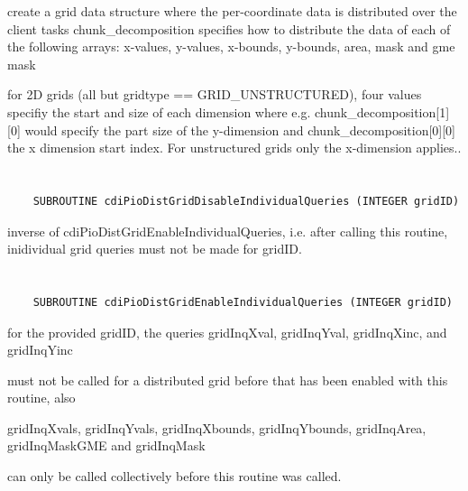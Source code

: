 create a grid data structure where the
per-coordinate data is distributed over the client tasks
chunk_decomposition specifies how to distribute the data of each of
the following arrays:
x-values, y-values, x-bounds, y-bounds, area, mask and gme mask

for 2D grids (all but gridtype == GRID_UNSTRUCTURED), four values specifiy the start and size of each dimension
where e.g. chunk_decomposition[1][0] would
specify the part size of the y-dimension and chunk_decomposition[0][0] the x dimension start
index. For unstructured grids only the x-dimension applies..


\section*{\tt {}}

\begin{verbatim}
    SUBROUTINE cdiPioDistGridDisableIndividualQueries (INTEGER gridID)
\end{verbatim}

inverse of
cdiPioDistGridEnableIndividualQueries, i.e. after calling this
routine, inidividual grid queries must not be made for gridID.


\section*{\tt {}}

\begin{verbatim}
    SUBROUTINE cdiPioDistGridEnableIndividualQueries (INTEGER gridID)
\end{verbatim}

for the provided gridID, the
queries
gridInqXval, gridInqYval, gridInqXinc, and gridInqYinc

must not be called for a distributed grid before that has been
enabled with this routine, also

gridInqXvals, gridInqYvals, gridInqXbounds, gridInqYbounds,
gridInqArea, gridInqMaskGME and gridInqMask

can only be called collectively before this routine was
called.


\section*{\tt {}}

